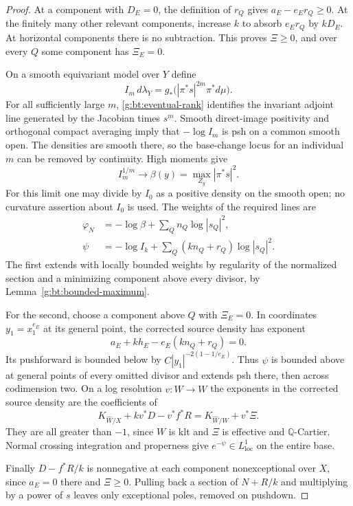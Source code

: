 \begin{proof}
At a component with $D_E=0$, the definition of $r_Q$ gives
$a_E-e_Er_Q\geq0$.  At the finitely many other relevant components,
increase $k$ to absorb $e_Er_Q$ by $kD_E$.  At horizontal components
there is no subtraction.  This proves $\Xi\geq0$, and over every $Q$
some component has $\Xi_E=0$.

On a smooth equivariant model over $Y$ define
\[
 I_m\,d\lambda_Y=g_*\bigl(|\pi^*s|^{2m}\pi^*d\mu\bigr).
\]
For all sufficiently large $m$, \eqref{g:bt:eventual-rank} identifies
the invariant adjoint line generated by the Jacobian times $s^m$.
Smooth direct-image positivity and orthogonal compact averaging imply
that $-\log I_m$ is psh on a common smooth open.
The densities are smooth there, so the base-change locus for an
individual $m$ can be removed by continuity.  High moments give
\[
 I_m^{1/m}\longrightarrow\beta(y)=\max_{Z_y}|\pi^*s|^2.
\]
For this limit one may divide by $I_0$ as a positive density on the
smooth open; no curvature assertion about $I_0$ is used.
The weights of the required lines are
\begin{equation}\label{g:bt:large-weights}
 \begin{split}
 \varphi_N&=-\log\beta+\sum_Q n_Q\log|s_Q|^2,\\
 \psi&=-\log I_k+\sum_Q(kn_Q+r_Q)\log|s_Q|^2.
 \end{split}
\end{equation}
The first extends with locally bounded weights by regularity of the
normalized section and a minimizing component above every divisor,
by Lemma~\ref{g:bt:bounded-maximum}.

For the second, choose a component above $Q$ with $\Xi_E=0$.
In coordinates $y_1=x_1^{e_E}$ at its general point, the corrected
source density has exponent
\[
          a_E+kh_E-e_E(kn_Q+r_Q)=0.
\]
Its pushforward is bounded below by $C|y_1|^{-2(1-1/e_E)}$.
Thus $\psi$ is bounded above at general points of every omitted
divisor and extends psh there, then across codimension two.
On a log resolution $v:\widehat W\to W$ the exponents in the corrected
source density are the coefficients of
\[
 K_{\widehat W/X}+kv^*D-v^*f^*R
                   =K_{\widehat W/W}+v^*\Xi.
\]
They are all greater than $-1$, since $W$ is klt and $\Xi$ is effective
and $\mathbb Q$-Cartier.  Normal crossing integration and properness
give $e^{-\psi}\in L^1_{\mathrm{loc}}$ on the entire base.

Finally $D-f^*R/k$ is nonnegative at each component nonexceptional
over $X$, since $a_E=0$ there and $\Xi\geq0$.  Pulling back a section
of $N+R/k$ and multiplying by a power of $s$ leaves only exceptional
poles, removed on pushdown.
\end{proof}

